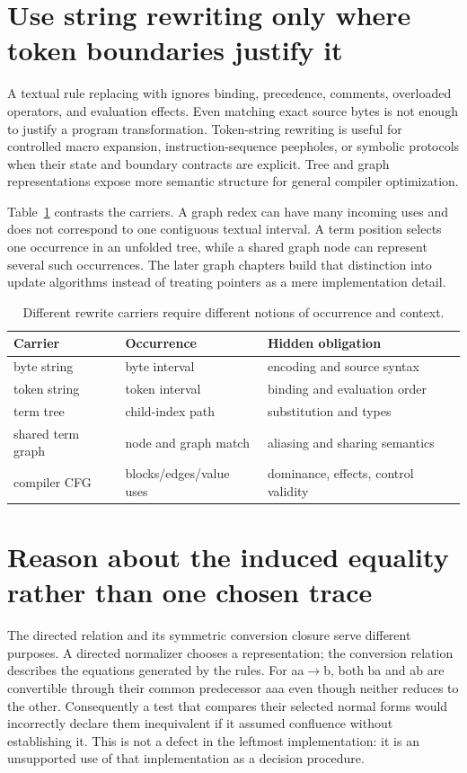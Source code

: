 \section{Use string rewriting only where token boundaries justify it}
\label{sec:ch81-compilers}
A textual rule replacing  with  ignores binding, precedence, comments, overloaded operators, and evaluation effects.
Even matching exact source bytes is not enough to justify a program transformation.
Token-string rewriting is useful for controlled macro expansion, instruction-sequence peepholes, or symbolic protocols when their state and boundary contracts are explicit.
Tree and graph representations expose more semantic structure for general compiler optimization.

Table~\ref{tab:ch81-levels} contrasts the carriers.
A graph redex can have many incoming uses and does not correspond to one contiguous textual interval.
A term position selects one occurrence in an unfolded tree, while a shared graph node can represent several such occurrences.
The later graph chapters build that distinction into update algorithms instead of treating pointers as a mere implementation detail.

\begin{table}[htbp]
\caption{Different rewrite carriers require different notions of occurrence and context.}
\label{tab:ch81-levels}
\centering
\begin{tabular}{lll}
\toprule
Carrier & Occurrence & Hidden obligation \\
\midrule
byte string & byte interval & encoding and source syntax \\
token string & token interval & binding and evaluation order \\
term tree & child-index path & substitution and types \\
shared term graph & node and graph match & aliasing and sharing semantics \\
compiler CFG & blocks/edges/value uses & dominance, effects, control validity \\
\bottomrule
\end{tabular}
\end{table}

\section{Reason about the induced equality rather than one chosen trace}
\label{sec:ch81-conversion}
The directed relation and its symmetric conversion closure serve different purposes.
A directed normalizer chooses a representation; the conversion relation describes the equations generated by the rules.
For aa$\to$b, both ba and ab are convertible through their common predecessor aaa even though neither reduces to the other.
Consequently a test that compares their selected normal forms would incorrectly declare them inequivalent if it assumed confluence without establishing it.
This is not a defect in the leftmost implementation: it is an unsupported use of that implementation as a decision procedure.

